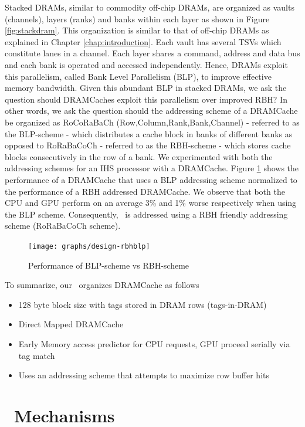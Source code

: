 Stacked DRAMs, similar to commodity off-chip DRAMs, are organized as vaults (channels), layers (ranks) and banks within each layer as shown in Figure \ref{fig:stackdram}. This organization is similar to that of off-chip DRAMs as explained in Chapter \ref{chap:introduction}. Each vault has several TSVs which constitute lanes in a channel. Each layer shares a command, address and data bus and each bank is  operated and accessed independently. Hence, DRAMs exploit this parallelism, called Bank Level Parallelism (BLP), to improve effective memory bandwidth. Given this abundant BLP in stacked DRAMs, we ask the question should DRAMCaches exploit this parallelism over improved RBH? In other words, we ask the question should the addressing scheme of a DRAMCache be organized as RoCoRaBaCh (Row,Column,Rank,Bank,Channel) - referred to as the BLP-scheme - which distributes a cache block in banks of different banks as opposed to RoRaBaCoCh - referred to as the RBH-scheme - which stores cache blocks consecutively in the row of a bank. We experimented with both the addressing schemes for an IHS processor with a DRAMCache. Figure \ref{fig:design-rbhblp} shows the performance of a DRAMCache that uses a BLP addressing scheme normalized to the performance of a RBH addressed DRAMCache. We observe that both the CPU and GPU perform on an average 3\% and 1\% worse respectively when using the BLP scheme. Consequently, \cachename\ is addressed using a RBH friendly addressing scheme (RoRaBaCoCh scheme). 
\begin{figure}[!htb]
	\centering
	\texttt{[image: graphs/design-rbhblp]}
	\caption{Performance of BLP-scheme vs RBH-scheme}
	\label{fig:design-rbhblp}
\end{figure}

\par To summarize, our \cachename\ organizes DRAMCache as follows
\begin{itemize}
	\item 128 byte block size with tags stored in DRAM rows (tags-in-DRAM)
	\item Direct Mapped DRAMCache
	\item Early Memory access predictor for CPU requests, GPU proceed serially via tag match
	\item Uses an addressing scheme that attempts to maximize row buffer hits
\end{itemize}


\section{\cachename\ Mechanisms}

